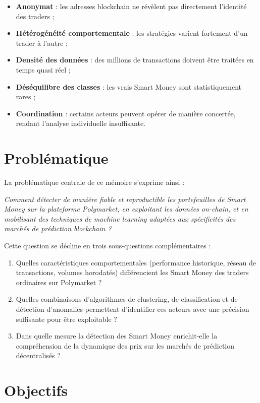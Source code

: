 \begin{itemize}
  \item \textbf{Anonymat} : les adresses blockchain ne révèlent pas directement l'identité des traders ;
  \item \textbf{Hétérogénéité comportementale} : les stratégies varient fortement d'un trader à l'autre ;
  \item \textbf{Densité des données} : des millions de transactions doivent être traitées en temps quasi réel ;
  \item \textbf{Déséquilibre des classes} : les vrais Smart Money sont statistiquement rares ;
  \item \textbf{Coordination} : certains acteurs peuvent opérer de manière concertée, rendant l'analyse individuelle insuffisante.
\end{itemize}

\section{Problématique}

La problématique centrale de ce mémoire s'exprime ainsi :

\medskip
\noindent\textit{Comment détecter de manière fiable et reproductible les portefeuilles de \og Smart Money \fg{} sur la plateforme Polymarket, en exploitant les données on-chain, et en mobilisant des techniques de machine learning adaptées aux spécificités des marchés de prédiction blockchain ?}
\medskip

Cette question se décline en trois sous-questions complémentaires :

\begin{enumerate}
  \item Quelles caractéristiques comportementales (performance historique, réseau de transactions, volumes horodatés) différencient les Smart Money des traders ordinaires sur Polymarket ?
  \item Quelles combinaisons d'algorithmes de clustering, de classification et de détection d'anomalies permettent d'identifier ces acteurs avec une précision suffisante pour être exploitable ?
  \item Dans quelle mesure la détection des Smart Money enrichit-elle la compréhension de la dynamique des prix sur les marchés de prédiction décentralisés ?
\end{enumerate}

\section{Objectifs}

